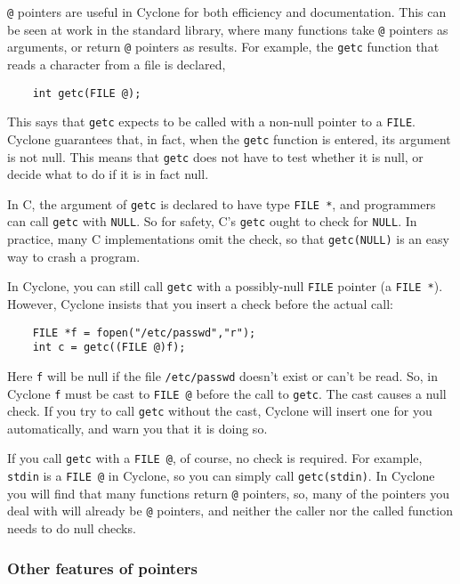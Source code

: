 \texttt{@} pointers are useful in Cyclone for both efficiency and
documentation.  This can be seen at work in the standard library,
where many functions take \texttt{@} pointers as arguments, or return
\texttt{@} pointers as results.  For example, the \texttt{getc}
function that reads a character from a file is declared,
\begin{verbatim}
    int getc(FILE @);
\end{verbatim}
This says that \texttt{getc} expects to be called with a non-null
pointer to a \texttt{FILE}\@.  Cyclone guarantees that, in fact, when
the \texttt{getc} function is entered, its argument is not null.  This
means that \texttt{getc} does not have to test whether it is null, or
decide what to do if it is in fact null.

In C, the argument of \texttt{getc} is declared to have type
\texttt{FILE *}, and programmers can call \texttt{getc} with
\texttt{NULL}\@.  So for safety, C's \texttt{getc} ought to check for
\texttt{NULL}\@.  In practice, many C implementations omit the check,
so that \texttt{getc(NULL)} is an easy way to crash a program.

In Cyclone, you can still call \texttt{getc} with a possibly-null
\texttt{FILE} pointer (a \texttt{FILE *}).  However, Cyclone insists
that you insert a check before the actual call:
\begin{verbatim}
    FILE *f = fopen("/etc/passwd","r");
    int c = getc((FILE @)f);
\end{verbatim}
Here \texttt{f} will be null if the file \texttt{/etc/passwd} doesn't
exist or can't be read.  So, in Cyclone \texttt{f} must be cast to
\texttt{FILE @} before the call to \texttt{getc}.  The cast causes a
null check.  If you try to call \texttt{getc} without the cast,
Cyclone will insert one for you automatically, and warn you that it is
doing so.

If you call \texttt{getc} with a \texttt{FILE @}, of course, no check
is required.  For example, \texttt{stdin} is a \texttt{FILE @} in
Cyclone, so you can simply call \texttt{getc(stdin)}.  In Cyclone you
will find that many functions return \texttt{@} pointers, so, many of
the pointers you deal with will already be \texttt{@} pointers, and
neither the caller nor the called function needs to do null checks.

\subsubsection*{Other features of pointers}

